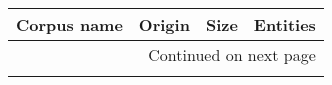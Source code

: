 \begin{tabular}
{|p{}|p{}|p{}|p{}|}
\\ \hline

\textbf{Corpus name}                                                 & \textbf{Origin}                                                                                                                                                                                  & \textbf{Size}                                                                                                                              & \textbf{Entities}                                                                                                                                                           \\ \hline
\endhead
\hline \multicolumn{4}{|r|}{{Continued on next page}} \\ \hline
\endfoot



\end{tabular}
